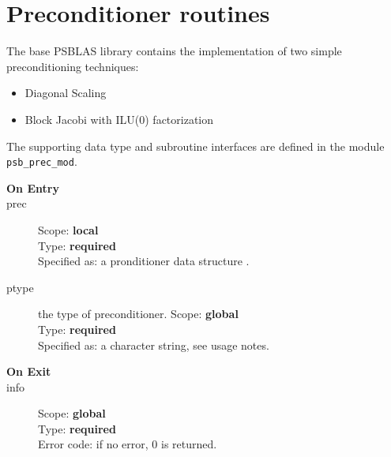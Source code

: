 \section{Preconditioner routines}
\label{sec:precs}

\label{sec:psprecs}
The base PSBLAS library  contains the implementation of two simple
preconditioning techniques:
\begin{itemize}
\item Diagonal Scaling
\item Block Jacobi with ILU(0) factorization
\end{itemize}
The supporting data type and subroutine interfaces are defined in the
module  \verb|psb_prec_mod|.







\begin{description}
\item[\bf On Entry]
\item[prec] 
Scope: {\bf local} \\
Type: {\bf required}\\
Specified as: a pronditioner data structure \precdata.
\item[ptype] the type of preconditioner. 
Scope: {\bf global} \\
Type: {\bf required}\\
Specified as: a character string, see usage notes.
\item[\bf On Exit]

\item[info] 
Scope: {\bf global} \\
Type: {\bf required}\\
Error code: if no error, 0 is returned.
\end{description}

